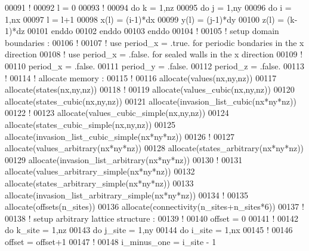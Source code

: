 \begin{DoxyCode}
00091 \textcolor{comment}{!}
00092 l = 0
00093 \textcolor{comment}{!}
00094 \textcolor{keyword}{do} k = 1,nz
00095    \textcolor{keyword}{do} j = 1,ny
00096       \textcolor{keyword}{do} i = 1,nx
00097          l = l+1
00098          x(l) = (i-1)*dx 
00099          y(l) = (j-1)*dy 
00100          z(l) = (k-1)*dz 
00101       \textcolor{keyword}{enddo}
00102    \textcolor{keyword}{enddo}
00103 \textcolor{keyword}{enddo}
00104 \textcolor{comment}{!}
00105 \textcolor{comment}{! setup domain boundaries : }
00106 \textcolor{comment}{!}
00107 \textcolor{comment}{! use period\_x = .true. for periodic bondaries in the x direction}
00108 \textcolor{comment}{! use period\_x = .false. for sealed walls in the x direction}
00109 \textcolor{comment}{!}
00110 period\_x = .false.
00111 period\_y = .false.
00112 period\_z = .false.
00113 \textcolor{comment}{!}
00114 \textcolor{comment}{! allocate memory :}
00115 \textcolor{comment}{!}
00116 \textcolor{keyword}{allocate}(values(nx,ny,nz))
00117 \textcolor{keyword}{allocate}(states(nx,ny,nz))
00118 \textcolor{comment}{!}
00119 \textcolor{keyword}{allocate}(values\_cubic(nx,ny,nz))
00120 \textcolor{keyword}{allocate}(states\_cubic(nx,ny,nz))
00121 \textcolor{keyword}{allocate}(invasion\_list\_cubic(nx*ny*nz))
00122 \textcolor{comment}{!}
00123 \textcolor{keyword}{allocate}(values\_cubic\_simple(nx,ny,nz))
00124 \textcolor{keyword}{allocate}(states\_cubic\_simple(nx,ny,nz))
00125 \textcolor{keyword}{allocate}(invasion\_list\_cubic\_simple(nx*ny*nz))
00126 \textcolor{comment}{!}
00127 \textcolor{keyword}{allocate}(values\_arbitrary(nx*ny*nz))
00128 \textcolor{keyword}{allocate}(states\_arbitrary(nx*ny*nz))
00129 \textcolor{keyword}{allocate}(invasion\_list\_arbitrary(nx*ny*nz))
00130 \textcolor{comment}{!}
00131 \textcolor{keyword}{allocate}(values\_arbitrary\_simple(nx*ny*nz))
00132 \textcolor{keyword}{allocate}(states\_arbitrary\_simple(nx*ny*nz))
00133 \textcolor{keyword}{allocate}(invasion\_list\_arbitrary\_simple(nx*ny*nz))
00134 \textcolor{comment}{!}
00135 \textcolor{keyword}{allocate}(offsets(n\_sites)) 
00136 \textcolor{keyword}{allocate}(connectivity(n\_sites+n\_sites*6)) 
00137 \textcolor{comment}{!}
00138 \textcolor{comment}{! setup arbitrary lattice structure :}
00139 \textcolor{comment}{!}
00140 offset = 0
00141 \textcolor{comment}{!}
00142 \textcolor{keyword}{do} k\_site = 1,nz
00143    \textcolor{keyword}{do} j\_site = 1,ny
00144       \textcolor{keyword}{do} i\_site = 1,nx
00145          \textcolor{comment}{!}
00146          offset = offset+1
00147          \textcolor{comment}{!}
00148          i\_minus\_one = i\_site - 1

\end{DoxyCode}
